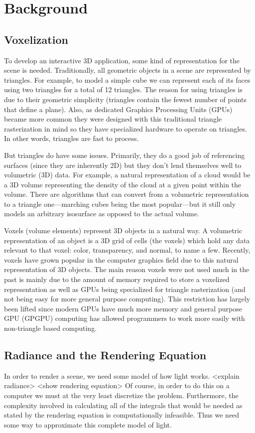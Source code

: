 \chapter{Background}

\section{Voxelization}
To develop an interactive 3D application, some kind of representation for the scene is needed. Traditionally, all geometric objects in a scene are represented by triangles. For example, to model a simple cube we can represent each of its faces using two triangles for a total of 12 triangles. The reason for using triangles is due to their geometric simplicity (triangles contain the fewest number of points that define a plane). Also, as dedicated Graphics Processing Units (GPUs) became more common they were designed with this traditional triangle rasterization in mind so they have specialized hardware to operate on triangles. In other words, triangles are fast to process.

But triangles do have some issues. Primarily, they do a good job of referencing surfaces (since they are inherently 2D) but they don't lend themselves well to volumetric (3D) data. For example, a natural representation of a cloud would be a 3D volume representing the density of the cloud at a given point within the volume. There are algorithms that can convert from a volumetric representation to a triangle one---marching cubes being the most popular---but it still only models an arbitrary isosurface as opposed to the actual volume.

Voxels (volume elements) represent 3D objects in a natural way. A volumetric representation of an object is a 3D grid of cells (the voxels) which hold any data relevant to that voxel: color, transparency, and normal, to name a few. Recently, voxels have grown popular in the computer graphics field due to this natural representation of 3D objects. The main reason voxels were not used much in the past is mainly due to the amount of memory required to store a voxelized representation as well as GPUs being specialized for triangle rasterization (and not being easy for more general purpose computing). This restriction has largely been lifted since modern GPUs have much more memory and general purpose GPU (GPGPU) computing has allowed programmers to work more easily with non-triangle based computing.

\section{Radiance and the Rendering Equation}
In order to render a scene, we need some model of how light works.
<explain radiance>
<show rendering equation>
Of course, in order to do this on a computer we must at the very least discretize the problem. Furthermore, the complexity involved in calculating all of the integrals that would be needed as stated by the rendering equation is computationally infeasible. Thus we need some way to approximate this complete model of light.

